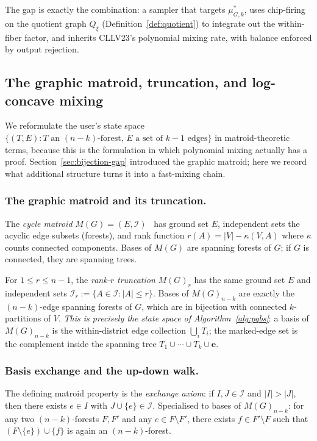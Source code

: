 \documentclass[11pt]{article}
\begin{document}
\noindent The gap is exactly the combination: a sampler that targets
$\mu^*_{G,k}$, uses chip-firing on the quotient graph $Q_{\xi}$
(Definition~\ref{def:quotient}) to integrate out the within-fiber factor,
and inherits CLLV23's polynomial mixing rate, with balance enforced by
output rejection.

\subsection{The graphic matroid, truncation, and log-concave mixing}\label{sec:matroid}

We reformulate the user's state space $\{(T,E) : T \text{ an }(n-k)\text{-forest},\, E \text{ a set of } k-1 \text{ edges}\}$
in matroid-theoretic terms, because this is the formulation in which
polynomial mixing actually has a proof. Section~\ref{sec:bijection-gap}
introduced the graphic matroid; here we record what additional structure
turns it into a fast-mixing chain.

\subsubsection*{The graphic matroid and its truncation.}

The \emph{cycle matroid} $M(G) = (E, \mathcal{I})$~\cite[Definition~14.1]{corry2018divisors}
has ground set $E$, independent sets the acyclic edge subsets (forests),
and rank function $r(A) = |V| - \kappa(V, A)$ where $\kappa$ counts
connected components. Bases of $M(G)$ are spanning forests of $G$; if $G$
is connected, they are spanning trees.

For $1 \leq r \leq n-1$, the \emph{rank-$r$ truncation} $M(G)_r$ has the
same ground set $E$ and independent sets
$\mathcal{I}_r := \{A \in \mathcal{I} : |A| \leq r\}$. Bases of
$M(G)_{n-k}$ are exactly the $(n-k)$-edge spanning forests of $G$, which
are in bijection with connected $k$-partitions of $V$. \emph{This is
precisely the state space of Algorithm~\ref{alg:pqbs}}: a basis of
$M(G)_{n-k}$ is the within-district edge collection $\bigcup_i T_i$;
the marked-edge set is the complement inside the spanning tree
$T_1 \cup \cdots \cup T_k \cup \mathbf{e}$.

\subsubsection*{Basis exchange and the up-down walk.}

The defining matroid property is the \emph{exchange axiom}: if
$I, J \in \mathcal{I}$ and $|I| > |J|$, then there exists $e \in I$ with
$J \cup \{e\} \in \mathcal{I}$. Specialised to bases of $M(G)_{n-k}$: for
any two $(n-k)$-forests $F, F'$ and any $e \in F \setminus F'$, there
exists $f \in F' \setminus F$ such that $(F \setminus \{e\}) \cup \{f\}$
is again an $(n-k)$-forest.
\end{document}

